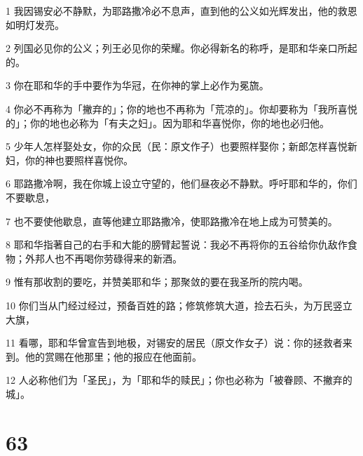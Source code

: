 \par 1 我因锡安必不静默，为耶路撒冷必不息声，直到他的公义如光辉发出，他的救恩如明灯发亮。
\par 2 列国必见你的公义；列王必见你的荣耀。你必得新名的称呼，是耶和华亲口所起的。
\par 3 你在耶和华的手中要作为华冠，在你神的掌上必作为冕旒。
\par 4 你必不再称为「撇弃的」；你的地也不再称为「荒凉的」。你却要称为「我所喜悦的」；你的地也必称为「有夫之妇」。因为耶和华喜悦你，你的地也必归他。
\par 5 少年人怎样娶处女，你的众民（民：原文作子）也要照样娶你；新郎怎样喜悦新妇，你的神也要照样喜悦你。
\par 6 耶路撒冷啊，我在你城上设立守望的，他们昼夜必不静默。呼吁耶和华的，你们不要歇息，
\par 7 也不要使他歇息，直等他建立耶路撒冷，使耶路撒冷在地上成为可赞美的。
\par 8 耶和华指著自己的右手和大能的膀臂起誓说：我必不再将你的五谷给你仇敌作食物；外邦人也不再喝你劳碌得来的新酒。
\par 9 惟有那收割的要吃，并赞美耶和华；那聚敛的要在我圣所的院内喝。
\par 10 你们当从门经过经过，预备百姓的路；修筑修筑大道，捡去石头，为万民竖立大旗，
\par 11 看哪，耶和华曾宣告到地极，对锡安的居民（原文作女子）说：你的拯救者来到。他的赏赐在他那里；他的报应在他面前。
\par 12 人必称他们为「圣民」，为「耶和华的赎民」；你也必称为「被眷顾、不撇弃的城」。

\chapter{63}

